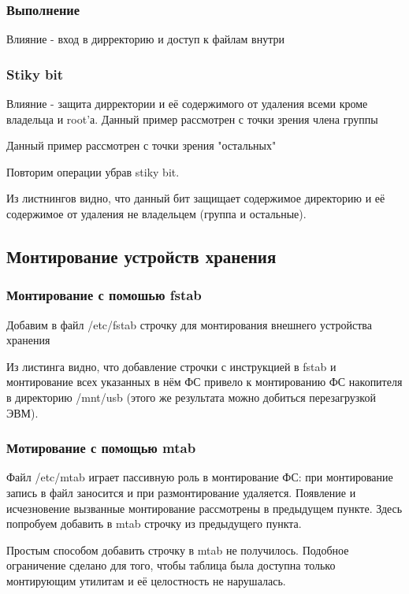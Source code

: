 \documentclass[a4paper]{article}
\begin{document}
\subsubsection{Выполнение}
Влияние - вход в дирректорию и доступ к файлам внутри



\subsubsection{Stiky bit}
Влияние - защита дирректории и её содержимого от удаления всеми кроме владельца и root'а.
Данный пример рассмотрен с точки зрения члена группы

Данный пример рассмотрен с точки зрения "остальных"

Повторим операции убрав stiky bit.

Из листнингов видно, что данный бит защищает содержимое директорию и её содержимое от удаления не владельцем (группа и остальные). 

\subsection{Монтирование устройств хранения}
\subsubsection{Монтирование с помошью fstab}
Добавим в файл /etc/fstab строчку для монтирования внешнего устройства хранения

Из листинга видно, что добавление строчки с инструкцией в fstab и монтирование всех указанных в нём 
ФС привело к монтированию ФС накопителя в директорию /mnt/usb (этого же результата можно добиться перезагрузкой ЭВМ).

\subsubsection{Мотирование с помощью mtab}
Файл /etc/mtab играет пассивную роль в монтирование ФС: при монтирование запись в файл заносится и при размонтирование удаляется. Появление и исчезновение вызванные монтирование рассмотрены в предыдущем пункте. Здесь попробуем добавить в mtab строчку из предыдущего пункта.

Простым способом добавить строчку в mtab  не получилось. Подобное ограничение сделано для того, чтобы таблица была доступна только монтирующим утилитам и её целостность не нарушалась.
\end{document}
